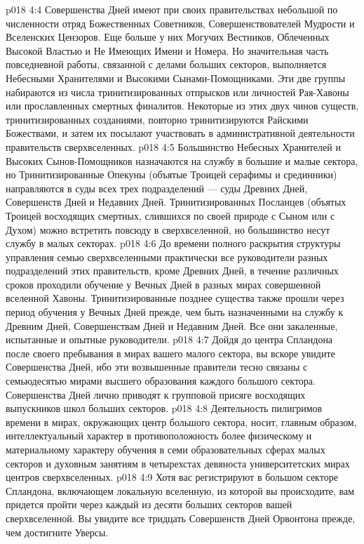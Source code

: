 \vs p018 4:4 \pc Совершенства Дней имеют при своих правительствах небольшой по численности отряд Божественных Советников, Совершенствователей Мудрости и Вселенских Цензоров. Еще больше у них Могучих Вестников, Облеченных Высокой Властью и Не Имеющих Имени и Номера. Но значительная часть повседневной работы, связанной с делами больших секторов, выполняется Небесными Хранителями и Высокими Сынами\hyp{}Помощниками. Эти две группы набираются из числа тринитизированных отпрысков или личностей Рая\hyp{}Хавоны или прославленных смертных финалитов. Некоторые из этих двух чинов существ, тринитизированных созданиями, повторно тринитизируются Райскими Божествами, и затем их посылают участвовать в административной деятельности правительств сверхвселенных.
\vs p018 4:5 Большинство Небесных Хранителей и Высоких Сынов\hyp{}Помощников назначаются на службу в большие и малые сектора, но Тринитизированные Опекуны (объятые Троицей серафимы и срединники) направляются в суды всех трех подразделений --- суды Древних Дней, Совершенств Дней и Недавних Дней. Тринитизированных Посланцев (объятых Троицей восходящих смертных, слившихся по своей природе с Сыном или с Духом) можно встретить повсюду в сверхвселенной, но большинство несут службу в малых секторах.
\vs p018 4:6 До времени полного раскрытия структуры управления семью сверхвселенными практически все руководители разных подразделений этих правительств, кроме Древних Дней, в течение различных сроков проходили обучение у Вечных Дней в разных мирах совершенной вселенной Хавоны. Тринитизированные позднее существа также прошли через период обучения у Вечных Дней прежде, чем быть назначенными на службу к Древним Дней, Совершенствам Дней и Недавним Дней. Все они закаленные, испытанные и опытные руководители.
\vs p018 4:7 \pc Дойдя до центра Спландона после своего пребывания в мирах вашего малого сектора, вы вскоре увидите Совершенства Дней, ибо эти возвышенные правители тесно связаны с семьюдесятью мирами высшего образования каждого большого сектора. Совершенства Дней лично приводят к групповой присяге восходящих выпускников школ больших секторов.
\vs p018 4:8 Деятельность пилигримов времени в мирах, окружающих центр большого сектора, носит, главным образом, интеллектуальный характер в противоположность более физическому и материальному характеру обучения в семи образовательных сферах малых секторов и духовным занятиям в четырехстах девяноста университетских мирах центров сверхвселенных.
\vs p018 4:9 Хотя вас регистрируют в большом секторе Спландона, включающем локальную вселенную, из которой вы происходите, вам придется пройти через каждый из десяти больших секторов вашей сверхвселенной. Вы увидите все тридцать Совершенств Дней Орвонтона прежде, чем достигните Уверсы.
